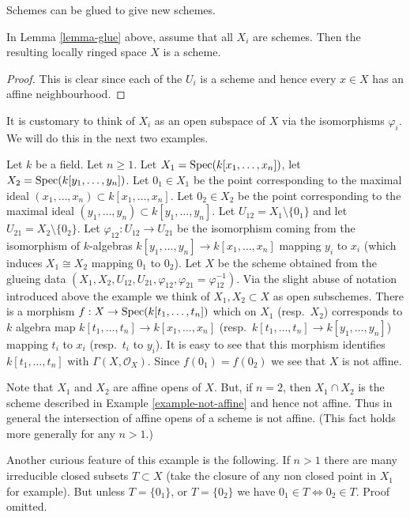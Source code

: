 \begin{lemma}
\label{lemma-glue-schemes}
\begin{reference}
\cite[Chapter II, \S 1, no. 34, Proposition 8, p. 227]{FAC}
\end{reference}
\begin{slogan}
Schemes can be glued to give new schemes.
\end{slogan}
In Lemma \ref{lemma-glue} above, assume that all
$X_i$ are schemes. Then the resulting locally ringed
space $X$ is a scheme.
\end{lemma}

\begin{proof}
This is clear since each of the $U_i$ is a scheme
and hence every $x \in X$ has an affine neighbourhood.
\end{proof}

\noindent
It is customary to think of $X_i$ as an open subspace of
$X$ via the isomorphisms $\varphi_i$. We will do this in
the next two examples.

\begin{example}
\label{example-affine-space-zero-doubled}
Let $k$ be a field. Let $n \geq 1$.
Let $X_1 = \mathop{\mathrm{Spec}}(k[x_1, \ldots, x_n])$,
let $X_2 = \mathop{\mathrm{Spec}}(k[y_1, \ldots, y_n])$.
Let $0_1 \in X_1$ be the point corresponding to the maximal ideal
$(x_1, \ldots, x_n) \subset k[x_1, \ldots, x_n]$.
Let $0_2 \in X_2$ be the point corresponding to the maximal ideal
$(y_1, \ldots, y_n) \subset k[y_1, \ldots, y_n]$.
Let $U_{12} = X_1 \setminus \{0_1\}$ and
let $U_{21} = X_2 \setminus \{0_2\}$. Let
$\varphi_{12} : U_{12} \to U_{21}$ be the isomorphism
coming from the isomorphism of $k$-algebras
$k[y_1, \ldots, y_n] \to k[x_1, \ldots, x_n]$
mapping $y_i$ to $x_i$ (which induces $X_1 \cong X_2$ mapping
$0_1$ to $0_2$).
Let $X$ be the scheme obtained from the glueing data
$(X_1, X_2, U_{12}, U_{21}, \varphi_{12},
\varphi_{21} = \varphi_{12}^{-1})$. Via the slight abuse
of notation introduced above the example we think of
$X_1, X_2 \subset X$ as open subschemes.
There is a morphism $f : X \to \mathop{\mathrm{Spec}}(k[t_1, \ldots, t_n])$
which on $X_1$ (resp.\ $X_2$) corresponds to $k$ algebra map
$k[t_1, \ldots, t_n] \to k[x_1, \ldots, x_n]$
(resp.\ $k[t_1, \ldots, t_n] \to k[y_1, \ldots, y_n]$)
mapping $t_i$ to $x_i$ (resp.\  $t_i$ to $y_i$).
It is easy to see that this morphism identifies
$k[t_1, \ldots, t_n]$ with $\Gamma(X, \mathcal{O}_X)$. Since
$f(0_1) = f(0_2)$ we see that $X$ is not affine.

\medskip\noindent
Note that $X_1$ and $X_2$ are affine opens of $X$.
But, if $n = 2$, then $X_1 \cap X_2$ is the scheme
described in Example \ref{example-not-affine} and hence not affine.
Thus in general the intersection of affine opens of a scheme
is not affine. (This fact holds more generally for any $n > 1$.)

\medskip\noindent
Another curious feature of this example is the following.
If $n > 1$ there are many irreducible closed subsets $T \subset X$
(take the closure of any non closed point in $X_1$ for example).
But unless $T = \{0_1\}$, or $T = \{0_2\}$ we have
$0_1 \in T \Leftrightarrow 0_2 \in T$. Proof omitted.
\end{example}

